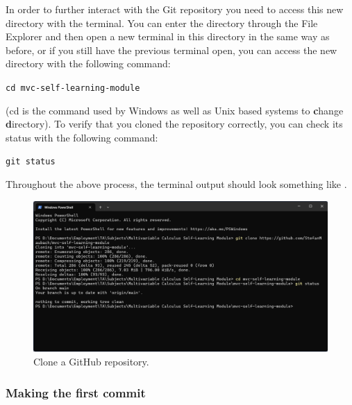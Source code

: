 \documentclass[a4paper,10pt]{article}
\begin{document}
In order to further interact with the Git repository you need to access this new directory with the terminal. You can enter the directory through the File Explorer and then open a new terminal in this directory in the same way as before, or if you still have the previous terminal open, you can access the new directory with the following command:

\texttt{cd mvc-self-learning-module}

(cd is the command used by Windows as well as Unix based systems to \textbf{c}hange \textbf{d}irectory). To verify that you cloned the repository correctly, you can check its status with the following command:

\texttt{git status}

Throughout the above process, the terminal output should look something like .

\begin{figure}[htbp]
    \centering
    \includegraphics[width=\textwidth]{git_clone.png}
    \caption{Clone a GitHub repository.}
    \label{fig:git_clone}   
\end{figure}


\subsubsection{Making the first commit}
\label{sec:first_commit}
\end{document}
